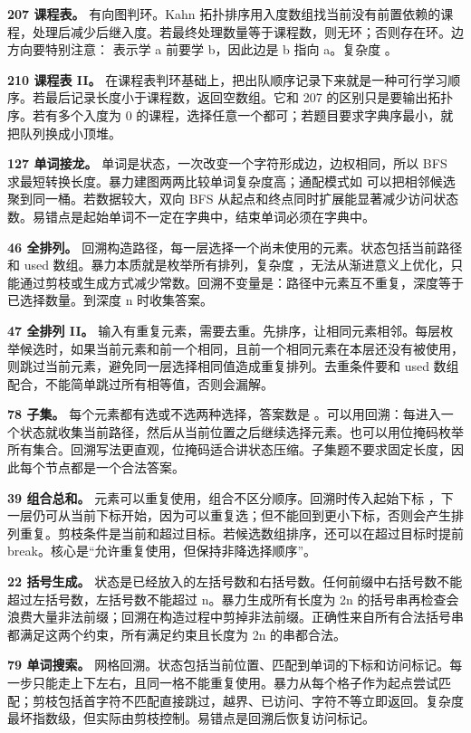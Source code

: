 \textbf{207 课程表。} 有向图判环。Kahn 拓扑排序用入度数组找当前没有前置依赖的课程，处理后减少后继入度。若最终处理数量等于课程数，则无环；否则存在环。边方向要特别注意：\code{[a,b]} 表示学 a 前要学 b，因此边是 b 指向 a。复杂度 。

\textbf{210 课程表 II。} 在课程表判环基础上，把出队顺序记录下来就是一种可行学习顺序。若最后记录长度小于课程数，返回空数组。它和 207 的区别只是要输出拓扑序。若有多个入度为 0 的课程，选择任意一个都可；若题目要求字典序最小，就把队列换成小顶堆。

\textbf{127 单词接龙。} 单词是状态，一次改变一个字符形成边，边权相同，所以 BFS 求最短转换长度。暴力建图两两比较单词复杂度高；通配模式如  可以把相邻候选聚到同一桶。若数据较大，双向 BFS 从起点和终点同时扩展能显著减少访问状态数。易错点是起始单词不一定在字典中，结束单词必须在字典中。

\textbf{46 全排列。} 回溯构造路径，每一层选择一个尚未使用的元素。状态包括当前路径和 used 数组。暴力本质就是枚举所有排列，复杂度 ，无法从渐进意义上优化，只能通过剪枝或生成方式减少常数。回溯不变量是：路径中元素互不重复，深度等于已选择数量。到深度 n 时收集答案。

\textbf{47 全排列 II。} 输入有重复元素，需要去重。先排序，让相同元素相邻。每层枚举候选时，如果当前元素和前一个相同，且前一个相同元素在本层还没有被使用，则跳过当前元素，避免同一层选择相同值造成重复排列。去重条件要和 used 数组配合，不能简单跳过所有相等值，否则会漏解。

\textbf{78 子集。} 每个元素都有选或不选两种选择，答案数是 。可以用回溯：每进入一个状态就收集当前路径，然后从当前位置之后继续选择元素。也可以用位掩码枚举所有集合。回溯写法更直观，位掩码适合讲状态压缩。子集题不要求固定长度，因此每个节点都是一个合法答案。

\textbf{39 组合总和。} 元素可以重复使用，组合不区分顺序。回溯时传入起始下标 ，下一层仍可从当前下标开始，因为可以重复选；但不能回到更小下标，否则会产生排列重复。剪枝条件是当前和超过目标。若候选数组排序，还可以在超过目标时提前 break。核心是“允许重复使用，但保持非降选择顺序”。

\textbf{22 括号生成。} 状态是已经放入的左括号数和右括号数。任何前缀中右括号数不能超过左括号数，左括号数不能超过 n。暴力生成所有长度为 2n 的括号串再检查会浪费大量非法前缀；回溯在构造过程中剪掉非法前缀。正确性来自所有合法括号串都满足这两个约束，所有满足约束且长度为 2n 的串都合法。

\textbf{79 单词搜索。} 网格回溯。状态包括当前位置、匹配到单词的下标和访问标记。每一步只能走上下左右，且同一格不能重复使用。暴力从每个格子作为起点尝试匹配；剪枝包括首字符不匹配直接跳过，越界、已访问、字符不等立即返回。复杂度最坏指数级，但实际由剪枝控制。易错点是回溯后恢复访问标记。

